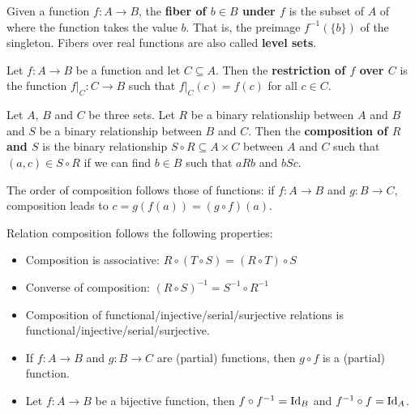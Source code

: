 \documentclass{bareminimum}
\begin{document}
\begin{defn}[Fiber]
	Given  a function $f : A \to B$, the \textbf{fiber of $b \in B$ under $f$} is the subset of $A$ of where the function takes the value $b$. That is, the preimage $f^{-1}(\{b\})$ of the singleton. Fibers over real functions are also called \textbf{level sets}.
\end{defn}


\begin{defn}[Restriction]
	Let $f : A  \to B$  be a function and let $C \subseteq A$. Then the \textbf{restriction of $f$ over $C$} is the function $f|_C : C \to B$ such that $f|_C(c) = f(c)$ for all $c \in C$.
\end{defn}

\begin{defn}[Composition]
	Let $A$, $B$ and $C$  be three sets. Let $R$ be a binary relationship between $A$ and $B$ and $S$ be a binary relationship between $B$ and $C$. Then the \textbf{composition of $R$ and $S$} is the binary relationship $S \circ R \subseteq A \times C$ between $A$ and $C$ such that $(a, c) \in S \circ R$ if we can find $b \in B$ such that $aRb$ and $bSc$.
\end{defn}

\begin{remark}
	The order of composition follows those of functions: if $f : A \to B$ and $g : B \to C$, composition leads to $c = g(f(a)) = (g \circ f)(a)$.
\end{remark}

\begin{prop}
	Relation composition  follows the following properties:
	\begin{itemize}
		\item Composition is associative: $R \circ (T \circ S) = (R \circ T) \circ S$
		\item Converse of composition: $(R \circ S)^{-1} = S^{-1} \circ R^{-1}$
		\item Composition of functional/injective/serial/surjective relations is \\ functional/injective/serial/surjective.
		\item If $f : A \to B$ and $g : B \to C$ are (partial) functions, then $g \circ f$ is a (partial) function.
		\item Let $f : A \to B$ be a bijective function, then $f \circ f^{-1} = \operatorname{Id}_B$ and $f^{-1} \circ f = \operatorname{Id}_A$.
	\end{itemize}
\end{prop}
\end{document}
